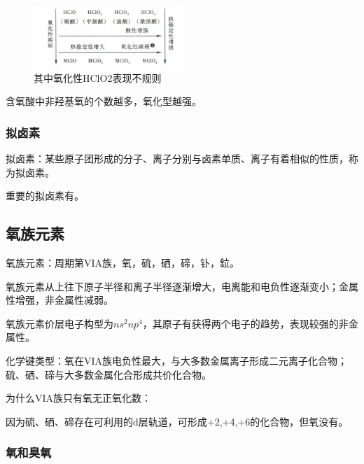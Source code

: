 \documentclass[a4paper,UTF8]{article}
\begin{document}
\begin{figure}[htpb]
	\centering
	\includegraphics[width=0.5\textwidth]{figure//变化规律.png}
	\caption{其中氧化性HClO2表现不规则}
	\label{fig:}
\end{figure}

\begin{tcolorbox}

	含氧酸中非羟基氧的个数越多，氧化型越强。

\end{tcolorbox}

\subsubsection{拟卤素}

拟卤素：某些原子团形成的分子、离子分别与卤素单质、离子有着相似的性质，称为拟卤素。

重要的拟卤素有。

\subsection{氧族元素}

氧族元素：周期第VIA族，氧，硫，硒，碲，钋，鉝。

氧族元素从上往下原子半径和离子半径逐渐增大，电离能和电负性逐渐变小；金属性增强，非金属性减弱。

氧族元素价层电子构型为$ns^2np^4$，其原子有获得两个电子的趋势，表现较强的非金属性。

化学键类型：氧在VIA族电负性最大，与大多数金属离子形成二元离子化合物；硫、硒、碲与大多数金属化合形成共价化合物。

\begin{tcolorbox}

	为什么VIA族只有氧无正氧化数：

	因为硫、硒、碲存在可利用的d层轨道，可形成+2,+4,+6的化合物，但氧没有。

\end{tcolorbox}

\subsubsection{氧和臭氧}
\end{document}
